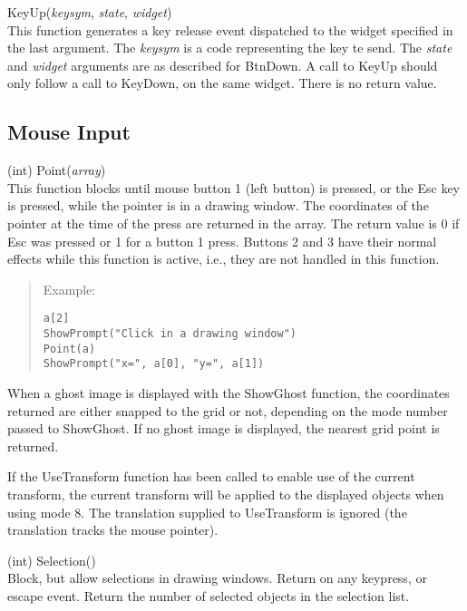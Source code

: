 \begin{description}
\item{\vt KeyUp({\it keysym\/}, {\it state\/}, {\it widget\/})}\\
This function generates a key release event dispatched to the widget
specified in the last argument.  The {\it keysym\/} is a code
representing the key te send.  The {\it state} and {\it widget}
arguments are as described for {\vt BtnDown}.  A call to {\vt KeyUp}
should only follow a call to {\vt KeyDown}, on the same widget.  There
is no return value.

\end{description}


\subsection{Mouse Input}

\begin{description}
\item{(int) \vt Point({\it array\/})}\\
This function blocks until mouse button 1 (left button) is pressed, or
the {\kb Esc} key is pressed, while the pointer is in a drawing
window.  The coordinates of the pointer at the time of the press are
returned in the array.  The return value is 0 if {\kb Esc} was pressed
or 1 for a button 1 press.  Buttons 2 and 3 have their normal effects
while this function is active, i.e., they are not handled in this
function.

\begin{quotation}
\noindent
Example:
\begin{verbatim}
a[2]
ShowPrompt("Click in a drawing window")
Point(a)
ShowPrompt("x=", a[0], "y=", a[1])
\end{verbatim}
\end{quotation}

When a ghost image is displayed with the {\vt ShowGhost} function, the
coordinates returned are either snapped to the grid or not, depending
on the mode number passed to {\vt ShowGhost}.  If no ghost image is
displayed, the nearest grid point is returned.

If the {\vt UseTransform} function has been called to enable use of
the current transform, the current transform will be applied to the
displayed objects when using mode 8.  The translation supplied to {\vt
UseTransform} is ignored (the translation tracks the mouse pointer).

\item{(int) \vt Selection()}\\
Block, but allow selections in drawing windows.  Return on any
keypress, or escape event.  Return the number of selected objects in
the selection list.

\end{description}



